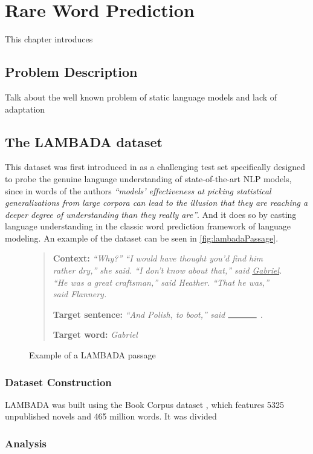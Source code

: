 \chapter{Rare Word Prediction}

This chapter introduces


\section{Problem Description}
\label{sec:problemRare}

Talk about the well known problem of static language models and lack of adaptation

\section{The LAMBADA dataset}
\label{sec:lambada}

This dataset was first introduced in \cite{paperno2016lambada} as a challenging test set specifically designed to probe the genuine language understanding of state-of-the-art NLP models, since in words of the authors \textit{``models' effectiveness at picking statistical generalizations from large corpora can lead to the illusion that they are reaching a deeper degree of understanding than they really are''}. And it does so by casting language understanding in
the classic word prediction framework of language modeling. An example of the dataset can be seen in \autoref{fig:lambadaPassage}.

\begin{figure}[H]
	\begin{quote} 		
		 \textbf{Context:} \textit{``Why?'' ``I would have thought you'd find him rather dry,'' she said. ``I don’t know about that,'' said \underline{Gabriel}. ``He was a great craftsman,'' said Heather. ``That he was,'' said Flannery.} \par
		\textbf{Target sentence:} \textit{``And Polish, to boot,'' said $\rule{1.2cm}{0.15mm}$} . \par
		\textbf{Target word:} \textit{Gabriel}
	\end{quote}
	\caption{Example of a LAMBADA passage} \label{fig:lambadaPassage}
\end{figure}

\subsection{Dataset Construction}

LAMBADA was built using the Book Corpus dataset \cite{zhu2015aligning}, which features 5325 unpublished novels and 465 million words. It was divided

\subsection{Analysis}

